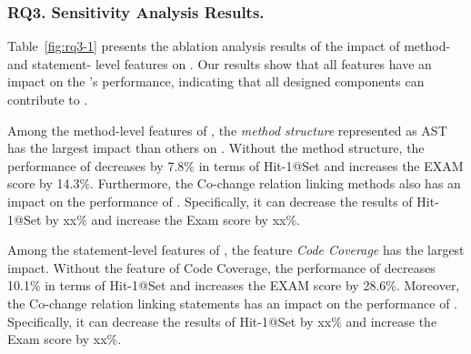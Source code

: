 \subsubsection{\bf RQ3. Sensitivity Analysis Results.}

Table~\ref{fig:rq3-1} presents the ablation analysis results of the impact of method- and statement- level features on {\tool}. Our results show that all features have an impact on the {\tool}'s performance, indicating that all designed components can contribute to {\tool}. 

Among the method-level features of {\tool}, the {\it method structure} represented as AST has the largest impact than others on {\tool}. Without the method structure, the performance of {\tool} decreases by 7.8\% in terms of Hit-1@Set and increases the EXAM score by 14.3\%. 
Furthermore, the Co-change relation linking methods also has an impact on the performance of {\tool}. Specifically, it can decrease the results of Hit-1@Set by xx\% and increase the Exam score by xx\%.

Among the statement-level features of {\tool}, the feature {\it Code Coverage} has the largest impact. Without the feature of Code Coverage, the performance of {\tool} decreases 10.1\% in terms of Hit-1@Set and increases the EXAM score by 28.6\%. Moreover, the Co-change relation linking statements has an impact on the performance of {\tool}. Specifically, it can decrease the results of Hit-1@Set by xx\% and increase the Exam score by xx\%.


